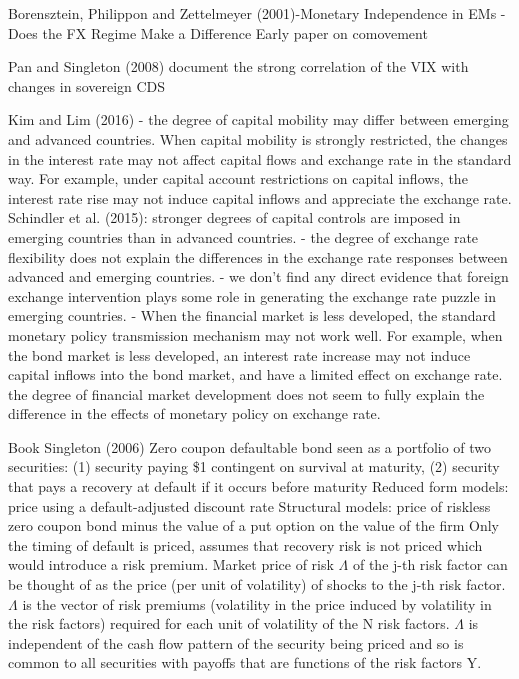 Borensztein, Philippon and Zettelmeyer (2001)-Monetary Independence in EMs - Does the FX Regime Make a Difference
Early paper on comovement

Pan and Singleton (2008)
document the strong correlation of the VIX with changes in sovereign CDS

Kim and Lim (2016)
- the degree of capital mobility may differ between emerging and advanced countries. When capital mobility is strongly restricted, the changes in the interest rate may not affect capital flows and exchange rate in the standard way. For example, under capital account restrictions on capital inflows, the interest rate rise may not induce capital inflows and appreciate the exchange rate.
Schindler et al. (2015): stronger degrees of capital controls are imposed in emerging countries than in advanced countries.
- the degree of exchange rate flexibility does not explain the differences in the exchange rate responses between advanced and emerging countries.
- we don’t find any direct evidence that foreign exchange intervention plays some role
in generating the exchange rate puzzle in emerging countries.
- When the financial market is less developed, the standard monetary policy transmission mechanism may not work well. For example, when the bond market is less developed, an interest rate increase may not induce capital inflows into the bond market, and have a limited effect on exchange rate. the degree of financial market development does not seem to fully explain the difference in the effects of monetary policy on exchange rate.

Book Singleton (2006)
Zero coupon defaultable bond seen as a portfolio of two securities: (1) security paying \$1 contingent on survival at maturity, (2) security that pays a recovery at default if it occurs before maturity
Reduced form models: price using a default-adjusted discount rate
Structural models: price of riskless zero coupon bond minus the value of a put option on the value of the firm
Only the timing of default is priced, assumes that recovery risk is not priced which would introduce a risk premium.
Market price of risk \(\Lambda\) of the j-th risk factor can be thought of as the price (per unit of volatility) of shocks to the j-th  risk factor.
\(\Lambda\) is the vector of risk premiums (volatility in the price induced by volatility in the risk factors) required for each unit of volatility of the N risk factors.
\(\Lambda\) is independent of the cash flow pattern of the security being priced and so is common to all securities with payoffs that are functions of the risk factors Y.

